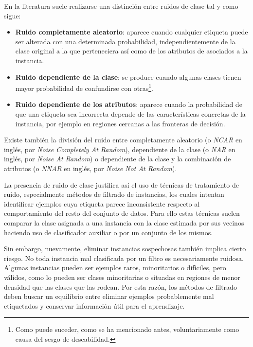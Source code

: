 \documentclass[print, color]{ugrTFG}
\begin{document}
En la literatura suele realizarse una distinción entre ruidos de clase tal y como sigue:
\begin{itemize}
    \item \textbf{Ruido completamente aleatorio}: aparece cuando cualquier etiqueta puede ser alterada con una determinada probabilidad, independientemente de la clase original a la que perteneciera así como de los atributos de asociados a la instancia.

    \item \textbf{Ruido dependiente de la clase}: se produce cuando algunas clases tienen mayor probabilidad de confundirse con otras\footnote{Como puede suceder, como se ha mencionado antes, voluntariamente como causa del sesgo de deseabilidad.}.

    \item \textbf{Ruido dependiente de los atributos}: aparece cuando la probabilidad de que una etiqueta sea incorrecta depende de las características concretas de la instancia, por ejemplo en regiones cercanas a las fronteras de decisión.
\end{itemize}
Existe también la división del ruido entre completamente aleatorio (o \textit{NCAR} en inglés, por \textit{Noise Completely At Random}), dependiente de la clase (o \textit{NAR} en inglés, por \textit{Noise At Random}) o dependiente de la clase y la combinación de atributos (o \textit{NNAR} en inglés, por \textit{Noise Not At Random}).


La presencia de ruido de clase justifica así el uso de técnicas de tratamiento de ruido, especialmente métodos de filtrado de instancias, los cuales intentan identificar ejemplos cuya etiqueta parece inconsistente respecto al comportamiento del resto del conjunto de datos. Para ello estas técnicas suelen comparar la clase asignada a una instancia con la clase estimada por sus vecinos haciendo uso de clasificador  auxiliar o por un conjunto de los mismos.

Sin embargo, nuevamente, eliminar instancias sospechosas también implica cierto riesgo. No toda instancia mal clasificada por un filtro es necesariamente ruidosa. Algunas instancias pueden ser ejemplos raros, minoritarios o difíciles, pero válidos, como lo pueden ser clases minoritarias o situadas en regiones de menor densidad que las clases que las rodean. Por esta razón, los métodos de filtrado deben buscar un equilibrio entre eliminar ejemplos probablemente mal etiquetados y conservar información útil para el aprendizaje.
\end{document}
